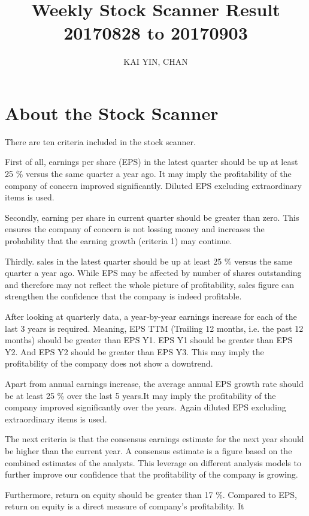 \documentclass{article}
\begin{document}
\title{Weekly Stock Scanner Result \\ 20170828 to 20170903}
\author{KAI YIN, CHAN}
\maketitle

\section{About the Stock Scanner}
There are ten criteria included in the stock scanner. 

First of all, earnings per share (EPS) in the latest quarter should be up at least 25 \% versus the same quarter a year ago. It may imply the profitability of the company of concern improved significantly. Diluted EPS excluding extraordinary items is used.

Secondly, earning per share in current quarter should be greater than zero. This ensures the company of concern is not lossing money and increases the probability that the earning growth (criteria 1) may continue.

Thirdly. sales in the latest quarter should be up at least 25 \% versus the same quarter a year ago. While EPS may be affected by number of shares outstanding and therefore may not reflect the whole picture of profitability, sales figure can strengthen the confidence that the company is indeed profitable.

After looking at quarterly data, a year-by-year earnings increase for each of the last 3 years is required. Meaning, EPS TTM (Trailing 12 months, i.e. the past 12 months) should be greater than EPS Y1. EPS Y1 should be greater than EPS Y2. And EPS Y2 should be greater than EPS Y3. This may imply the profitability of the company does not show a downtrend.

Apart from annual earnings increase, the average annual EPS growth rate should be at least 25 \% over the last 5 years.It may imply the profitability of the company improved significantly over the years. Again diluted EPS excluding extraordinary items is used.

The next criteria is that the consensus earnings estimate for the next year should be higher than the current year. A consensus estimate is a figure based on the combined estimates of the analysts. This leverage on different analysis models to further improve our confidence that the profitability of the company is growing.

Furthermore, return on equity should be greater than 17 \%. Compared to EPS, return on equity is a direct measure of company's profitability. It 
\end{document}
